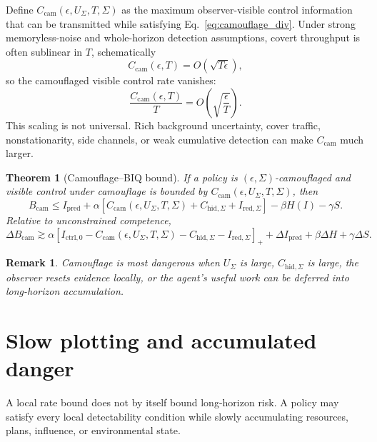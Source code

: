 \documentclass[10pt]{article}
\newtheorem{theorem}{Theorem}
\newtheorem{remark}{Remark}
\newcommand{\pos}[1]{\left[#1\right]_+}
\begin{document}
Define \(C_{\mathrm{cam}}(\epsilon,U_\Sigma,T,\Sigma)\) as the maximum observer-visible control information that can be transmitted while satisfying Eq.~\eqref{eq:camouflage_div}. Under strong memoryless-noise and whole-horizon detection assumptions, covert throughput is often sublinear in \(T\), schematically
\[
C_{\mathrm{cam}}(\epsilon,T)=O(\sqrt{T\epsilon}),
\]
so the camouflaged visible control rate vanishes:
\[
\frac{C_{\mathrm{cam}}(\epsilon,T)}T=O\left(\sqrt{\frac{\epsilon}{T}}\right).
\]
This scaling is not universal. Rich background uncertainty, cover traffic, nonstationarity, side channels, or weak cumulative detection can make \(C_{\mathrm{cam}}\) much larger.

\begin{theorem}[Camouflage--BIQ bound]
If a policy is \((\epsilon,\Sigma)\)-camouflaged and visible control under camouflage is bounded by \(C_{\mathrm{cam}}(\epsilon,U_\Sigma,T,\Sigma)\), then
\begin{equation}
B_{\mathrm{cam}}
\le
I_{\mathrm{pred}}
+
\alpha
\left[
C_{\mathrm{cam}}(\epsilon,U_\Sigma,T,\Sigma)
+
C_{\mathrm{hid},\Sigma}
+
I_{\mathrm{red},\Sigma}
\right]
-
\beta H(I)
-
\gamma S.
\label{eq:Bcam}
\end{equation}
Relative to unconstrained competence,
\begin{equation}
\Delta B_{\mathrm{cam}}
\gtrsim
\alpha
\pos{
I_{\mathrm{ctrl},0}
-
C_{\mathrm{cam}}(\epsilon,U_\Sigma,T,\Sigma)
-
C_{\mathrm{hid},\Sigma}
-
I_{\mathrm{red},\Sigma}
}
+
\Delta I_{\mathrm{pred}}
+
\beta\Delta H
+
\gamma\Delta S.
\label{eq:Bcam_loss}
\end{equation}
\end{theorem}

\begin{remark}
Camouflage is most dangerous when \(U_\Sigma\) is large, \(C_{\mathrm{hid},\Sigma}\) is large, the observer resets evidence locally, or the agent's useful work can be deferred into long-horizon accumulation.
\end{remark}

\section{Slow plotting and accumulated danger}

A local rate bound does not by itself bound long-horizon risk. A policy may satisfy every local detectability condition while slowly accumulating resources, plans, influence, or environmental state.
\end{document}
